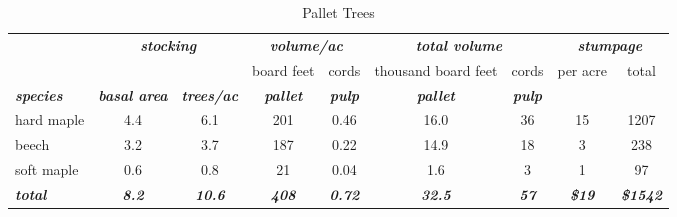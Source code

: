 \documentclass[landscape]{article}
\begin{document}
\begin{table}[H]

\caption{\label{tab:unnamed-chunk-13}Pallet Trees}
\fontsize{10}{12}\selectfont
\begin{tabular}[t]{lcccccccc}
\toprule
\multicolumn{1}{c}{\em{\textbf{ }}} & \multicolumn{2}{c}{\em{\textbf{stocking}}} & \multicolumn{2}{c}{\em{\textbf{volume/ac }}} & \multicolumn{2}{c}{\em{\textbf{total volume}}} & \multicolumn{2}{c}{\em{\textbf{stumpage}}} \\
\cmidrule(l{3pt}r{3pt}){2-3} \cmidrule(l{3pt}r{3pt}){4-5} \cmidrule(l{3pt}r{3pt}){6-7} \cmidrule(l{3pt}r{3pt}){8-9}
\multicolumn{3}{c}{ } & \multicolumn{1}{c}{board feet} & \multicolumn{1}{c}{cords} & \multicolumn{1}{c}{thousand board feet} & \multicolumn{1}{c}{cords} & \multicolumn{1}{c}{per acre} & \multicolumn{1}{c}{total} \\
\cmidrule(l{3pt}r{3pt}){4-4} \cmidrule(l{3pt}r{3pt}){5-5} \cmidrule(l{3pt}r{3pt}){6-6} \cmidrule(l{3pt}r{3pt}){7-7} \cmidrule(l{3pt}r{3pt}){8-8} \cmidrule(l{3pt}r{3pt}){9-9}
\rowcolor[HTML]{DCDCDC}  \em{\textbf{species}} & \em{\textbf{basal area}} & \em{\textbf{trees/ac}} & \em{\textbf{pallet}} & \em{\textbf{pulp}} & \em{\textbf{pallet}} & \em{\textbf{pulp}} & \em{\textbf{ }} & \em{\textbf{ }}\\
\midrule
\rowcolor{gray!6}  hard maple & 4.4 & 6.1 & 201 & 0.46 & 16.0 & 36 & 15 & 1207\\
 
beech & 3.2 & 3.7 & 187 & 0.22 & 14.9 & 18 & 3 & 238\\
 
\rowcolor{gray!6}  soft maple & 0.6 & 0.8 & 21 & 0.04 & 1.6 & 3 & 1 & 97\\
 
\rowcolor[HTML]{DCDCDC}  \em{\textbf{total}} & \em{\textbf{8.2}} & \em{\textbf{10.6}} & \em{\textbf{408}} & \em{\textbf{0.72}} & \em{\textbf{32.5}} & \em{\textbf{57}} & \em{\textbf{\$19}} & \em{\textbf{\$1542}}\\
\bottomrule
\end{tabular}
\end{table}
\end{document}
